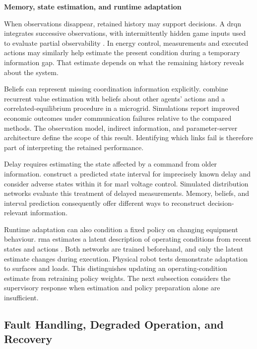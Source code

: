 \smallskip
\noindent\textbf{Memory, state estimation, and runtime adaptation}\par\nobreak\smallskip
When observations disappear, retained history may support decisions. A \gls{drqn} integrates successive observations, with intermittently hidden game inputs used to evaluate partial observability \parencite{hausknecht2015drqn}. In energy control, measurements and executed actions may similarly help estimate the present condition during a temporary information gap. That estimate depends on what the remaining history reveals about the system.

Beliefs can represent missing coordination information explicitly. \textcite{recC24} combine recurrent value estimation with beliefs about other agents' actions and a correlated-equilibrium procedure in a microgrid. Simulations report improved economic outcomes under communication failures relative to the compared methods. The observation model, indirect information, and parameter-server architecture define the scope of this result. Identifying which links fail is therefore part of interpreting the retained performance.

Delay requires estimating the state affected by a command from older information. \textcite{cheng2024delay} construct a predicted state interval for imprecisely known delay and consider adverse states within it for \gls{marl} voltage control. Simulated distribution networks evaluate this treatment of delayed measurements. Memory, beliefs, and interval prediction consequently offer different ways to reconstruct decision-relevant information.

Runtime adaptation can also condition a fixed policy on changing equipment behaviour. \gls{rma} estimates a latent description of operating conditions from recent states and actions \parencite{kumar2021rma}. Both networks are trained beforehand, and only the latent estimate changes during execution. Physical robot tests demonstrate adaptation to surfaces and loads. This distinguishes updating an operating-condition estimate from retraining policy weights. The next subsection considers the supervisory response when estimation and policy preparation alone are insufficient.

\subsection{Fault Handling, Degraded Operation, and Recovery}
\label{sec:ch3-recovery}

